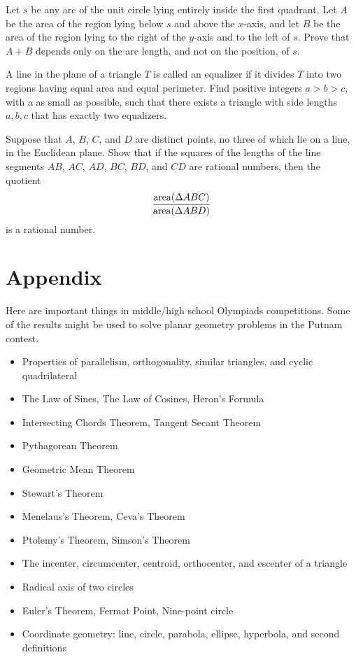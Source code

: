 \documentclass{article}
\begin{document}
\begin{exercise}[1998 A2]
Let $s$ be any arc of the unit circle lying entirely inside the first quadrant. Let $A$ be the area of the region lying below $s$ and above the $x$-axis, and let $B$ be the area of the region lying to the right of the $y$-axis and to the left of $s$. Prove that $A + B$ depends only on the arc length, and not on the position, of $s$.
\end{exercise}

\begin{exercise}[2017 B5]
A line in the plane of a triangle $T$ is called an equalizer if it divides $T$ into two regions having equal area and equal perimeter. Find positive integers $a > b > c$, with a as small as possible, such that there exists a triangle with side lengths $a, b, c$ that has exactly two equalizers.
\end{exercise}

\begin{exercise}[2018 A6]
Suppose that $A$, $B$, $C$, and $D$ are distinct points, no three of which lie on a line, in the Euclidean plane. Show that if the squares of the lengths of the line segments $AB$, $AC$, $AD$, $BC$, $BD$, and $CD$ are rational numbers, then the quotient
\[\frac{\operatorname{area}(\Delta ABC)}{\operatorname{area}(\Delta ABD)}\]
is a rational number.
\end{exercise}

\newpage
\section{Appendix}
Here are important things in middle/high school Olympiads competitions. Some of the results might be used to solve planar geometry problems in the Putnam contest.    
\begin{itemize}
    \item Properties of parallelism, orthogonality, similar triangles, and cyclic quadrilateral   
    \item The Law of Sines, The Law of Cosines, Heron's Formula
    \item Intersecting Chords Theorem, Tangent Secant Theorem 
    \item Pythagorean Theorem 
    \item Geometric Mean Theorem 
    \item Stewart's Theorem 
    \item Menelaus's Theorem, Ceva's Theorem 
    \item Ptolemy's Theorem, Simson's Theorem 
    \item The incenter, circumcenter, centroid, orthocenter, and escenter of a triangle 
    \item Radical axis of two circles 
    \item Euler's Theorem, Fermat Point, Nine-point circle 
    \item Coordinate geometry: line, circle, parabola, ellipse, hyperbola, and second definitions  
\end{itemize}
\end{document}
